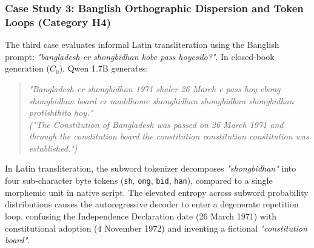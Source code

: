 \subsubsection{Case Study 3: Banglish Orthographic Dispersion and Token Loops (Category H4)}
The third case evaluates informal Latin transliteration using the Banglish prompt: \emph{"bangladesh er shongbidhan kobe pass hoyesilo?"}. In closed-book generation ($C_0$), Qwen 1.7B generates:
\begin{quote}
    \emph{"Bangladesh er shongbidhan 1971 shaler 26 March e pass hoy ebong shongbidhan board er maddhome shongbidhan shongbidhan shongbidhan protishthito hoy."} \\
    \emph{("The Constitution of Bangladesh was passed on 26 March 1971 and through the constitution board the constitution constitution constitution was established.")}
\end{quote}
In Latin transliteration, the subword tokenizer decomposes \emph{"shongbidhan"} into four sub-character byte tokens (\texttt{sh}, \texttt{ong}, \texttt{bid}, \texttt{han}), compared to a single morphemic unit in native script. The elevated entropy across subword probability distributions causes the autoregressive decoder to enter a degenerate repetition loop, confusing the Independence Declaration date (26 March 1971) with constitutional adoption (4 November 1972) and inventing a fictional \emph{"constitution board"}.
